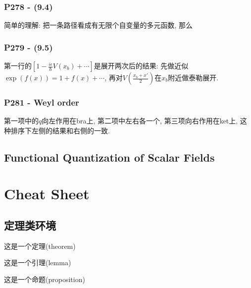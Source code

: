 \documentclass[cn,hazy,blue,11pt,device=normal,chinesefont=founder]{elegantnote}
\begin{document}
\subsubsection{P278 - (9.4)}

\begin{remark}
  简单的理解: 把一条路径看成有无限个自变量的多元函数, 那么
\end{remark}

\subsubsection{P279 - (9.5)}

第一行的$[1-\frac{i\epsilon}{\hbar}V(x_b)+\cdots]$是展开两次后的结果: 先做近似$\exp(f(x)) = 1 + f(x) + \cdots$, 再对$V(\frac{x_b + x'}{2})$在$x_b$附近做泰勒展开.  

\subsubsection{P281 - Weyl order}

第一项中的$q$向左作用在bra上, 第二项中左右各一个, 第三项向右作用在ket上, 这种排序下左侧的结果和右侧的一致. 

\subsection{Functional Quantization of Scalar Fields}



\clearpage

\section{Cheat Sheet}

\subsection{定理类环境}

\begin{theorem}[名称]
  这是一个定理(theorem)
\end{theorem}

\begin{lemma}[名称]
  这是一个引理(lemma)
\end{lemma}

\begin{proposition}[名称]
  这是一个命题(proposition)
\end{proposition}
\end{document}
